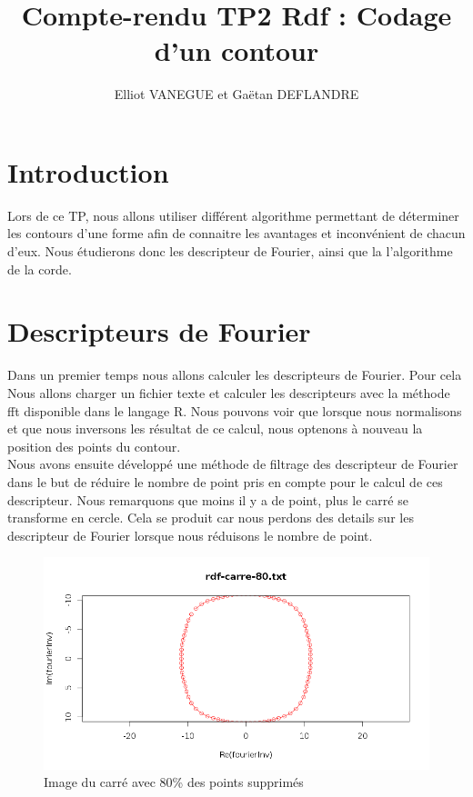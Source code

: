 \documentclass[11pt]{article}
\title{Compte-rendu TP2 Rdf : Codage d'un contour}
\author{Elliot VANEGUE et Gaëtan DEFLANDRE}
\begin{document}


  \maketitle
  
  \mbox{}
  \newpage
  \clearpage
  
  \section{Introduction}
  Lors de ce TP, nous allons utiliser différent algorithme permettant de déterminer
  les contours d'une forme afin de connaitre les avantages et inconvénient de chacun
  d'eux. Nous étudierons donc les descripteur de Fourier, ainsi que la l'algorithme
  de la corde.
  
  \section{Descripteurs de Fourier}
  Dans un premier temps nous allons calculer les descripteurs de Fourier. Pour cela
  Nous allons charger un fichier texte et calculer les descripteurs avec la méthode
  fft disponible dans le langage R. Nous pouvons voir que lorsque
  nous normalisons et que nous inversons les résultat de ce calcul, nous optenons
  à nouveau la position des points du contour.\\ 
  
  Nous avons ensuite développé une méthode de filtrage des descripteur de Fourier dans
  le but de réduire le nombre de point pris en compte pour le calcul de ces descripteur.
  Nous remarquons que moins il y a de point, plus le carré se transforme en cercle.
  Cela se produit car nous perdons des details sur les descripteur de Fourier 
  lorsque nous réduisons le nombre de point.
  
  \begin{center}
    \begin{figure}[!h]
      \includegraphics[width=15cm]{../resultat/carre-fourier-20.png}
      \caption{Image du carré avec 80\% des points supprimés}
    \end{figure}
  \end{center}
  
\end{document}
